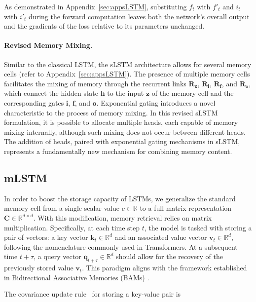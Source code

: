 As demonstrated in Appendix~\ref{sec:appsLSTM}, substituting $f_t$ with $f'_t$ and $i_t$ with $i'_t$ during the forward computation leaves both the network’s overall output and the gradients of the loss relative to its parameters unchanged.

\paragraph{Revised Memory Mixing.} Similar to the classical LSTM, the sLSTM architecture allows for several memory cells (refer to Appendix~\ref{sec:appsLSTM}). The presence of multiple memory cells facilitates the mixing of memory through the recurrent links $\mathbf{R}_{\mathbf{z}}$, $\mathbf{R}_{\mathbf{i}}$, $\mathbf{R}_{\mathbf{f}}$, and $\mathbf{R}_{\mathbf{o}}$, which connect the hidden state $\mathbf{h}$ to the input $\mathbf{z}$ of the memory cell and the corresponding gates $\mathbf{i}$, $\mathbf{f}$, and $\mathbf{o}$. Exponential gating introduces a novel characteristic to the process of memory mixing. In this revised sLSTM formulation, it is possible to allocate multiple heads, each capable of memory mixing internally, although such mixing does not occur between different heads. The addition of heads, paired with exponential gating mechanisms in sLSTM, represents a fundamentally new mechanism for combining memory content.

\subsection{mLSTM}
\label{sec:mLSTM}

In order to boost the storage capacity of LSTMs, we generalize the standard memory cell from a single scalar value $c \in \mathbb{R}$ to a full matrix representation $\mathbf{C} \in \mathbb{R}^{d \times d}$. With this modification, memory retrieval relies on matrix multiplication. Specifically, at each time step $t$, the model is tasked with storing a pair of vectors: a key vector $\mathbf{k}_t \in \mathbb{R}^d$ and an associated value vector $\mathbf{v}_t \in \mathbb{R}^d$, following the nomenclature commonly used in Transformers. At a subsequent time $t+\tau$, a query vector $\mathbf{q}_{t+\tau} \in \mathbb{R}^d$ should allow for the recovery of the previously stored value $\mathbf{v}_t$. This paradigm aligns with the framework established in Bidirectional Associative Memories (BAMs) \citep{Kohonen:72,Anderson:72,Nakano:72,Anderson:77}.

The covariance update rule~\citep{Sejnowski:77,Dayan:91} for storing a key-value pair is

